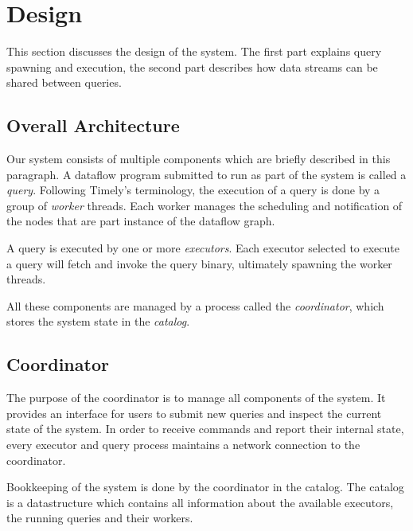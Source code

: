 \chapter{Design}\label{ch:design}

This section discusses the design of the system. The first part explains query
spawning and execution, the second part describes how data streams can be shared
between queries.

\section{Overall Architecture}

Our system consists of multiple components which are briefly described in this
paragraph. A dataflow program submitted to run as part of the system is
called a \emph{query}. Following Timely's terminology, the execution of a query
is done by a group of \emph{worker} threads. Each worker manages the scheduling and
notification of the nodes that are part instance of the dataflow graph. 

A query is executed by one or more \emph{executors}. Each executor selected to
execute a query will fetch and invoke the query binary, ultimately spawning the
worker threads. 

All these components are managed by a process called the \emph{coordinator},
which stores the system state in the \emph{catalog}.

\section{Coordinator}

The purpose of the coordinator is to manage all components of the system. It
provides an interface for users to submit new queries and inspect the current
state of the system. In order to receive commands and report their internal state,
every executor and query process maintains a network connection to the coordinator.

Bookkeeping of the system is done by the coordinator in the catalog. The
catalog is a datastructure which contains all information about the available
executors, the running queries and their workers. 

